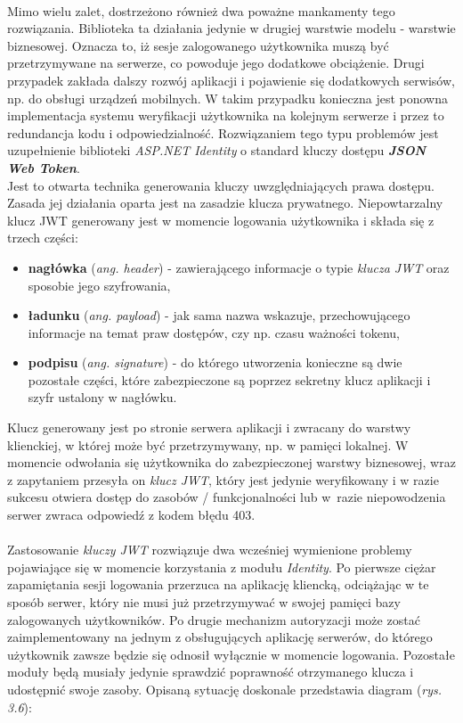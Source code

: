     \\
    Mimo wielu zalet, dostrzeżono również dwa poważne mankamenty tego rozwiązania. Biblioteka ta działania jedynie w drugiej warstwie modelu - warstwie biznesowej. Oznacza to, iż sesje zalogowanego użytkownika muszą być przetrzymywane na serwerze, co powoduje jego dodatkowe obciążenie. Drugi przypadek zakłada dalszy rozwój aplikacji i pojawienie się dodatkowych serwisów, np. do obsługi urządzeń mobilnych. W takim przypadku konieczna jest ponowna implementacja systemu weryfikacji użytkownika na kolejnym serwerze i przez to redundancja kodu i odpowiedzialność. Rozwiązaniem tego typu problemów jest uzupełnienie biblioteki \textit{ASP.NET Identity} o standard kluczy dostępu \textbf{\textit{JSON Web Token}}.\\
    Jest to otwarta technika generowania kluczy uwzględniających prawa dostępu. Zasada jej działania oparta jest na zasadzie klucza prywatnego. Niepowtarzalny klucz JWT generowany jest w momencie logowania użytkownika i składa się z trzech części:
    \begin{itemize}
        \item \textbf{nagłówka} (\textit{ang. header}) - zawierającego informacje o typie \textit{klucza JWT} oraz sposobie jego szyfrowania,
        \item \textbf{ładunku} (\textit{ang. payload}) - jak sama nazwa wskazuje, przechowującego informacje na temat praw dostępów, czy np. czasu ważności tokenu,
        \item \textbf{podpisu} (\textit{ang. signature}) - do którego utworzenia konieczne są dwie pozostałe części, które zabezpieczone są poprzez sekretny klucz aplikacji i szyfr ustalony w nagłówku.
    \end{itemize}
    Klucz generowany jest po stronie serwera aplikacji i zwracany do warstwy klienckiej, w której może być przetrzymywany, np. w pamięci lokalnej. W momencie odwołania się użytkownika do zabezpieczonej warstwy biznesowej, wraz z zapytaniem przesyła on \textit{klucz JWT}, który jest jedynie weryfikowany i w razie sukcesu otwiera dostęp do zasobów / funkcjonalności lub w~razie niepowodzenia serwer zwraca odpowiedź z kodem błędu 403.\\
\\
Zastosowanie \textit{kluczy JWT} rozwiązuje dwa wcześniej wymienione problemy pojawiające się w momencie korzystania z modułu \textit{Identity}. Po pierwsze ciężar zapamiętania sesji logowania przerzuca na aplikację kliencką, odciążając w te sposób serwer, który nie musi już przetrzymywać w swojej pamięci bazy zalogowanych użytkowników. Po drugie mechanizm autoryzacji może zostać zaimplementowany na jednym z obsługujących aplikację serwerów, do którego użytkownik zawsze będzie się odnosił wyłącznie w momencie logowania. Pozostałe moduły będą musiały jedynie sprawdzić poprawność otrzymanego klucza i udostępnić swoje zasoby. Opisaną sytuację doskonale przedstawia diagram (\textit{rys. 3.6}):
    
